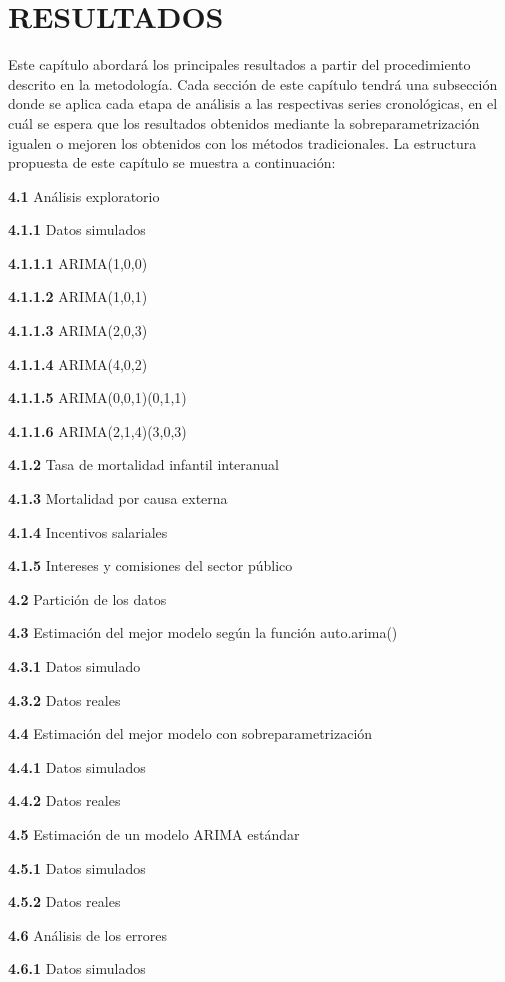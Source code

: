 \documentclass[
]{article}
\begin{document}
\newpage

\section{RESULTADOS}

Este capítulo abordará los principales resultados a partir del
procedimiento descrito en la metodología. Cada sección de este capítulo
tendrá una subsección donde se aplica cada etapa de análisis a las
respectivas series cronológicas, en el cuál se espera que los resultados
obtenidos mediante la sobreparametrización igualen o mejoren los
obtenidos con los métodos tradicionales. La estructura propuesta de este
capítulo se muestra a continuación:

\textbf{4.1} Análisis exploratorio

\textbf{4.1.1} Datos simulados

\textbf{4.1.1.1} ARIMA(1,0,0)

\textbf{4.1.1.2} ARIMA(1,0,1)

\textbf{4.1.1.3} ARIMA(2,0,3)

\textbf{4.1.1.4} ARIMA(4,0,2)

\textbf{4.1.1.5} ARIMA(0,0,1)(0,1,1)

\textbf{4.1.1.6} ARIMA(2,1,4)(3,0,3)

\textbf{4.1.2} Tasa de mortalidad infantil interanual

\textbf{4.1.3} Mortalidad por causa externa

\textbf{4.1.4} Incentivos salariales

\textbf{4.1.5} Intereses y comisiones del sector público

\textbf{4.2} Partición de los datos

\textbf{4.3} Estimación del mejor modelo según la función auto.arima()

\textbf{4.3.1} Datos simulado

\textbf{4.3.2} Datos reales

\textbf{4.4} Estimación del mejor modelo con sobreparametrización

\textbf{4.4.1} Datos simulados

\textbf{4.4.2} Datos reales

\textbf{4.5} Estimación de un modelo ARIMA estándar

\textbf{4.5.1} Datos simulados

\textbf{4.5.2} Datos reales

\textbf{4.6} Análisis de los errores

\textbf{4.6.1} Datos simulados
\end{document}
